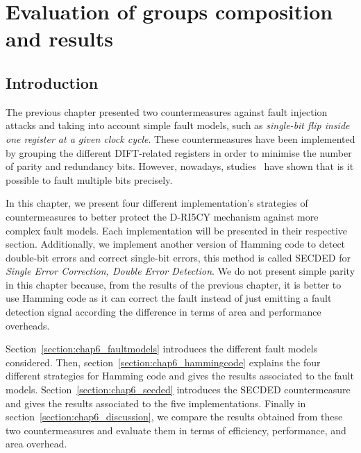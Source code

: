 \chapter{Evaluation of groups composition and results}
\label{chapter:exp_setup_results}
\minitoc

\section{Introduction}
The previous chapter presented two countermeasures against fault injection attacks and taking into account simple fault models, such as \textit{single-bit flip inside one register at a given clock cycle}. These countermeasures have been implemented by grouping the different DIFT-related registers in order to minimise the number of parity and redundancy bits. However, nowadays, studies~\cite{CGVCBLC-22-cardis,VDSPB-24-jce} have shown that is it possible to fault multiple bits precisely.

In this chapter, we present four different implementation's strategies of countermeasures to better protect the D-RI5CY mechanism against more complex fault models. Each implementation will be presented in their respective section. Additionally, we implement another version of Hamming code to detect double-bit errors and correct single-bit errors, this method is called SECDED for \textit{Single Error Correction, Double Error Detection}. We do not present simple parity in this chapter because, from the results of the previous chapter, it is better to use Hamming code as it can correct the fault instead of just emitting a fault detection signal according the difference in terms of area and performance overheads.

Section~\ref{section:chap6_faultmodels} introduces the different fault models considered.
Then, section~\ref{section:chap6_hammingcode} explains the four different strategies for Hamming code and gives the results associated to the fault models.
Section~\ref{section:chap6_secded} introduces the SECDED countermeasure and gives the results associated to the five implementations.
Finally in section~\ref{section:chap6_discussion}, we compare the results obtained from these two countermeasures and evaluate them in terms of efficiency, performance, and area overhead.

